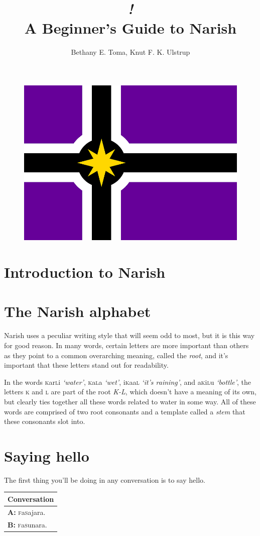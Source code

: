\documentclass[a5paper,10pt,twoside,openright]{memoir}
\title{{\fontsize{70}{70}\selectfont \itshape \famword{i}{f}{aa}{m}{ak}!} \\ \fontsize{25}{30} \sffamily A Beginner's Guide to Narish}
\author{Bethany E. Toma, Knut F. K. Ulstrup}
\date{}%
\newcommand{\famword}[5]{#1\textsc{#2}#3\textsc{#4}#5}
\newenvironment{conversation}
    {\begin{table}[ht]
        \begin{tabular}{p{0.962\textwidth}}
        \toprule
        \textbf{Conversation} \\
        \midrule
    }
    { 
        \bottomrule
        \end{tabular}
    \end{table}
    }
\newcommand{\diagline}[2]{\hspace{2em} \textbf{\uppercase{#1:}} {#2} \\}
\begin{document}
\begin{titlingpage}
    \maketitle
    \begin{figure}[ht]
        \includegraphics[width=\textwidth]{nareland3small.png}
    \end{figure}
\end{titlingpage}

\frontmatter

\newpage

\tableofcontents

\mainmatter

\chapter{Introduction to Narish}

\chapter{The Narish alphabet}

Narish uses a peculiar writing style that will seem odd to most, but it is this way for good reason. In many words, certain letters are more important than others as they point to a common overarching meaning, called the \emph{root}, and it's important that these letters stand out for readability.

In the words \famword{}{k}{ar}{l}{i} \textit{`water'}, \famword{}{k}{a}{l}{a} \textit{`wet'}, \famword{i}{k}{aa}{l}{} \textit{`it's raining'}, and \famword{a}{k}{i}{l}{u} \textit{`bottle'}, the letters \textsc{k} and \textsc{l} are part of the root \emph{K-L}, which doesn't have a meaning of its own, but clearly ties together all these words related to water in some way. All of these words are comprised of two root consonants and a template called a \emph{stem} that these consonants slot into. 

\chapter{Saying hello}

The first thing you'll be doing in any conversation is to say hello. 

\begin{conversation}
    \diagline{A}{\famword{}{f}{a}{s}{}ajara.}
    \diagline{B}{\famword{}{f}{a}{s}{}unara.}
\end{conversation}
\end{document}
